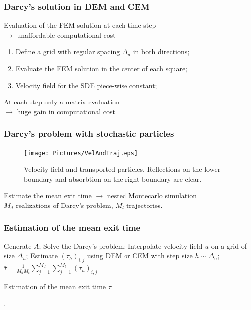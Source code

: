 \begin{frame}
\frametitle{Darcy's solution in DEM and CEM}
Evaluation of the FEM solution at each time step \\ $\to$ unaffordable computational cost

\vspace{0.5cm}
\begin{minipage}[0]{0.49\linewidth}
	\centering
	\resizebox{1\linewidth}{!}{ }  
\end{minipage}
\begin{minipage}[0.5]{0.49\linewidth}
\begin{enumerate}
	\item Define a grid with regular spacing $\Delta_u$ in both directions;
	\item Evaluate the FEM solution in the center of each square;
	\item Velocity field for the SDE piece-wise constant;
\end{enumerate}
\end{minipage}

\vspace{0.5cm}
At each step only a matrix evaluation \\ $\to$ huge gain in computational cost
\end{frame}

\begin{frame}
\frametitle{Darcy's problem with stochastic particles}
\begin{figure}
\texttt{[image: Pictures/VelAndTraj.eps]}
\caption{Velocity field and transported particles. Reflections on the lower boundary and absorbtion on the right boundary are clear.}
\end{figure}
\end{frame}

\begin{frame}
Estimate the mean exit time $\to$ nested Montecarlo simulation \\
$M_d$ realizations of Darcy's problem, $M_t$ trajectories.
\frametitle{Estimation of the mean exit time}
\begin{algorithm}[H]
	\begin{algorithmic}
	\STATE Generate $A$;
	\STATE Solve the Darcy's problem;
	\STATE Interpolate velocity field $u$ on a grid of size $\Delta_u$;
	\STATE Estimate $(\tau_h)_{i,j}$ using DEM or CEM with step size $h \sim \Delta_u$;
	\ENDFOR
	\ENDFOR
	\RETURN $\bar \tau = \frac{1}{M_dM_t}\sum_{j=1}^{M_d} \sum_{j=1}^{M_t} (\tau_h)_{i,j}$
	\end{algorithmic}
	\caption{Estimation of the mean exit time $\bar \tau$}
\end{algorithm}

\color{blue}{This algorithm gives consistent result with satisfying performances}.
\end{frame}


